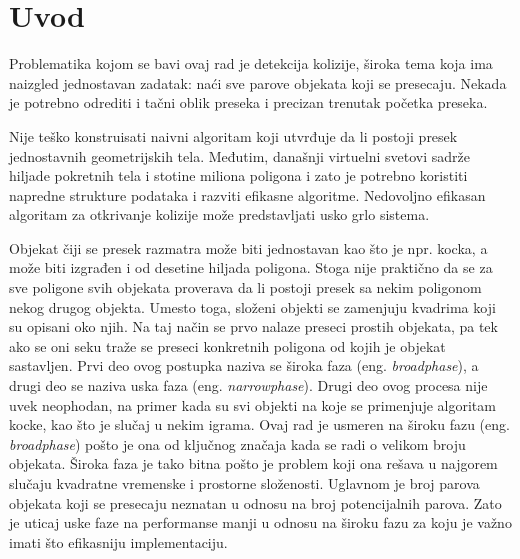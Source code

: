 \documentclass[12pt,oneside]{memoir}
\begin{document}
\frontmatter

\naslovna
\komisija

\begingroup
\vspace*{-5\baselineskip}
\tableofcontents
\endgroup

\mainmatter

\chapter{Uvod}
\label{sec:uvod}

Problematika kojom se bavi ovaj rad je detekcija kolizije, široka tema koja ima naizgled jednostavan zadatak:
naći sve parove objekata koji se presecaju. Nekada je potrebno odrediti i tačni oblik preseka i precizan trenutak početka preseka. 

Nije teško konstruisati naivni algoritam koji utvrđuje da li postoji presek jednostavnih geometrijskih tela.
Međutim, današnji virtuelni svetovi sadrže hiljade pokretnih tela i stotine miliona poligona i 
zato je potrebno koristiti napredne strukture podataka i razviti efikasne algoritme. 
Nedovoljno efikasan algoritam za otkrivanje kolizije može predstavljati usko grlo sistema.

Objekat čiji se presek razmatra može biti jednostavan kao što je npr. kocka, a može biti izgrađen i od desetine hiljada poligona.
Stoga nije praktično da se 
za sve poligone svih objekata proverava da li postoji presek sa nekim poligonom nekog drugog objekta.
Umesto toga, složeni objekti se zamenjuju kvadrima koji su opisani oko njih.
Na taj način se prvo nalaze preseci prostih objekata, pa tek ako se oni seku traže se preseci konkretnih poligona od kojih je objekat sastavljen.
%
Prvi deo ovog postupka naziva se široka faza (eng. {\em broadphase}), a drugi deo se naziva uska faza (eng. {\em narrowphase}).
Drugi deo ovog procesa nije uvek neophodan, na primer kada su svi objekti na koje se primenjuje algoritam kocke, kao što je slučaj u nekim igrama.
Ovaj rad je usmeren na široku fazu (eng. {\em broadphase}) pošto je ona od ključnog značaja kada se radi o velikom broju objekata.
Široka faza je tako bitna pošto je problem koji ona rešava u najgorem slučaju kvadratne vremenske i prostorne složenosti.
Uglavnom je broj parova objekata koji se presecaju neznatan u odnosu na broj potencijalnih parova. 
Zato je uticaj uske faze na performanse manji u odnosu na široku fazu za koju je važno imati što efikasniju implementaciju.
\end{document}
